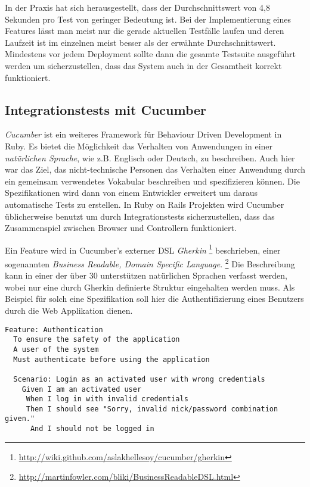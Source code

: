 In der Praxis hat sich herausgestellt, dass der Durchschnittswert von
4,8 Sekunden pro Test von geringer Bedeutung ist. Bei der
Implementierung eines Features lässt man meist nur die gerade
aktuellen Testfälle laufen und deren Laufzeit ist im einzelnen meist
besser als der erwähnte Durchschnittswert. Mindestens vor jedem
Deployment sollte dann die gesamte Testsuite ausgeführt werden um
sicherzustellen, dass das System auch in der Gesamtheit korrekt
funktioniert.

\subsection{Integrationstests mit Cucumber}

\textit{Cucumber} \cite{cucumber} ist ein weiteres Framework für
Behaviour Driven Development in Ruby. Es bietet die Möglichkeit das
Verhalten von Anwendungen in einer \textit{natürlichen Sprache}, wie
z.B. Englisch oder Deutsch, zu beschreiben. Auch hier war das Ziel,
das nicht-technische Personen das Verhalten einer Anwendung durch ein
gemeinsam verwendetes Vokabular beschreiben und spezifizieren können.
Die Spezifikationen wird dann von einem Entwickler erweitert um daraus
automatische Tests zu erstellen. In Ruby on Rails Projekten wird
Cucumber üblicherweise benutzt um durch Integrationstests
sicherzustellen, dass das Zusammenspiel zwischen Browser und
Controllern funktioniert.

Ein Feature wird in Cucumber's externer DSL \textit{Gherkin}
\footnote{\url{http://wiki.github.com/aslakhellesoy/cucumber/gherkin}}
beschrieben, einer sogenannten \textit{Business Readable, Domain
  Specific Language}.
\footnote{\url{http://martinfowler.com/bliki/BusinessReadableDSL.html}}
Die Beschreibung kann in einer der über 30 unterstützen natürlichen
Sprachen verfasst werden, wobei nur eine durch Gherkin definierte
Struktur eingehalten werden muss. Als Beispiel für solch eine
Spezifikation soll hier die Authentifizierung eines Benutzers durch
die Web Applikation dienen.

{\footnotesize
\begin{verbatim}
Feature: Authentication
  To ensure the safety of the application
  A user of the system
  Must authenticate before using the application

  Scenario: Login as an activated user with wrong credentials
    Given I am an activated user
     When I log in with invalid credentials
     Then I should see "Sorry, invalid nick/password combination given."
      And I should not be logged in
\end{verbatim}
}

